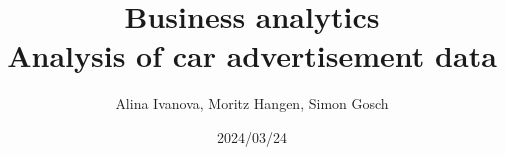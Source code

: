 \title{Business analytics \\ Analysis of car advertisement data}
\author{Alina Ivanova, Moritz Hangen, Simon Gosch}
\date{2024/03/24}
\maketitle
